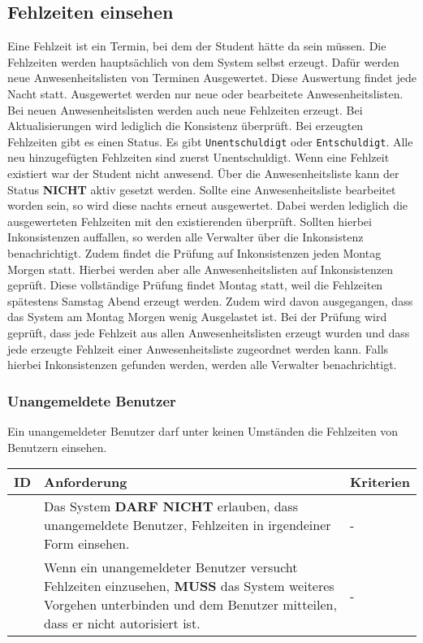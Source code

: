 \newpage

\subsection{Fehlzeiten einsehen}
Eine Fehlzeit ist ein Termin, bei dem der Student hätte da sein müssen. Die Fehlzeiten werden hauptsächlich von dem System selbst erzeugt. Dafür werden neue Anwesenheitslisten von Terminen Ausgewertet. Diese Auswertung findet jede Nacht statt. Ausgewertet werden nur neue oder bearbeitete Anwesenheitslisten. Bei neuen Anwesenheitslisten werden auch neue Fehlzeiten erzeugt. Bei Aktualisierungen wird lediglich die Konsistenz überprüft. Bei erzeugten Fehlzeiten gibt es einen Status. Es gibt \texttt{Unentschuldigt} oder \texttt{Entschuldigt}. Alle neu hinzugefügten Fehlzeiten sind zuerst Unentschuldigt. Wenn eine Fehlzeit existiert war der Student nicht anwesend. Über die Anwesenheitsliste kann der Status \textbf{NICHT} aktiv gesetzt werden. Sollte eine Anwesenheitsliste bearbeitet worden sein, so wird diese nachts erneut ausgewertet. Dabei werden lediglich die ausgewerteten Fehlzeiten mit den existierenden überprüft. Sollten hierbei Inkonsistenzen auffallen, so werden alle Verwalter über die Inkonsistenz benachrichtigt. Zudem findet die Prüfung auf Inkonsistenzen jeden Montag Morgen statt. Hierbei werden aber alle Anwesenheitslisten auf Inkonsistenzen geprüft. Diese vollständige Prüfung findet Montag statt, weil die Fehlzeiten spätestens Samstag Abend erzeugt werden. Zudem wird davon ausgegangen, dass das System am Montag Morgen wenig Ausgelastet ist. Bei der Prüfung wird geprüft, dass jede Fehlzeit aus allen Anwesenheitslisten erzeugt wurden und dass jede erzeugte Fehlzeit einer Anwesenheitsliste zugeordnet werden kann. Falls hierbei Inkonsistenzen gefunden werden, werden alle Verwalter benachrichtigt. 

\vspace{12pt}

\subsubsection{Unangemeldete Benutzer}
Ein unangemeldeter Benutzer darf unter keinen Umständen die Fehlzeiten von Benutzern einsehen.

\vspace{12pt}

\begin{tabular} {|p{}|p{}|p{}|}
	\hline
	ID & Anforderung & Kriterien \\
	\hline
	\printfreqnr
	& Das System \textbf{DARF NICHT} erlauben, dass unangemeldete Benutzer, Fehlzeiten in irgendeiner Form einsehen. 
	& - \\
	\hline
	\printfreqnr
	& Wenn ein unangemeldeter Benutzer versucht Fehlzeiten einzusehen, \textbf{MUSS} das System weiteres Vorgehen unterbinden und dem Benutzer mitteilen, dass er nicht autorisiert ist.
	& - \\ 
	\hline
\end{tabular}

